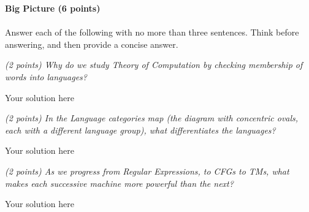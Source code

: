 \documentclass[12pt]{article}
\newenvironment{question}[2][Question]{\begin{trivlist}
\item[\hskip \labelsep {\bfseries #1}\hskip \labelsep {\bfseries #2.}]}{\end{trivlist}}
\newenvironment{solution}[1][Solution:]{\begin{trivlist}
\item[\hskip \labelsep {\bfseries #1}\hskip \labelsep {\bfseries}]\color{blue}}{\end{trivlist}}
\begin{document}
\clearpage
\begin{question}{1}\textbf{Big Picture  (6 points)}\\\\

Answer each of the following with no more than three sentences. Think before answering, and then provide a concise answer.


\begin{enumerate}[(a)]  
  \item \textit{(2 points) Why do we study Theory of Computation by checking membership of words into languages?}

    \begin{solution}
  Your solution here
    \end{solution}
    
 
  \item \textit{(2 points) In the Language categories map (the diagram with concentric ovals, each with a different language group), what differentiates the languages?}
 
    \begin{solution}
       Your solution here
    \end{solution}


        \item \textit{(2 points) As we progress from Regular Expressions, to CFGs to TMs, what makes each successive machine more powerful than the next?}
 
    \begin{solution}
       Your solution here
    \end{solution}
    
\end{enumerate}

\end{question}
\end{document}
